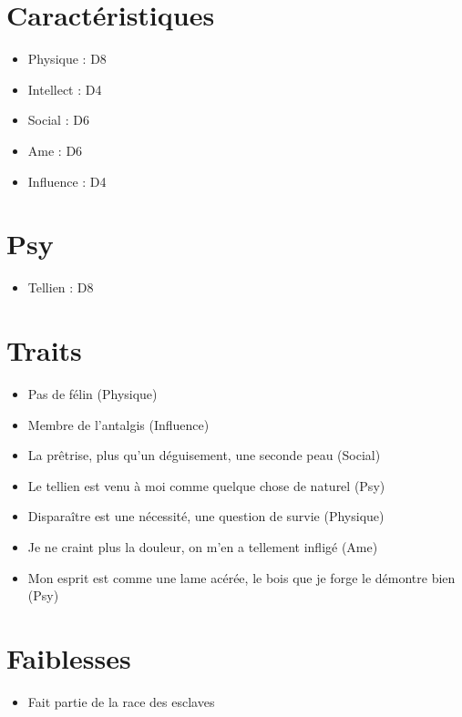 \begin{multicols}{2}

\section*{Caractéristiques}

\begin{itemize}
\item Physique : D8
\item Intellect : D4
\item Social : D6
\item Ame : D6
\item Influence : D4
\end{itemize}

\section*{Psy}

\begin{itemize}
\item Tellien : D8
\end{itemize}

\section*{Traits}

\begin{itemize}
\item Pas de félin (Physique)
\item Membre de l'antalgis (Influence)
\item La prêtrise, plus qu'un déguisement, une seconde peau (Social)
\item Le tellien est venu à moi comme quelque chose de naturel (Psy)
\item Disparaître est une nécessité, une question de survie (Physique)
\item Je ne craint plus la douleur, on m'en a tellement infligé (Ame)
\item Mon esprit est comme une lame acérée, le bois que je forge le démontre bien (Psy)
\end{itemize}

\section*{Faiblesses}

\begin{itemize}
\item Fait partie de la race des esclaves
\end{itemize}


\end{multicols}
